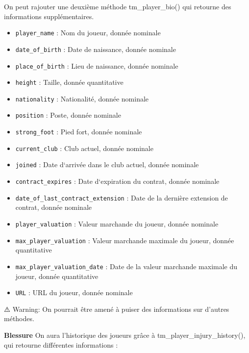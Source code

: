 \documentclass[
]{article}
\begin{document}
On peut rajouter une deuxième méthode tm\_player\_bio() qui retourne des
informations supplémentaires.

\begin{itemize}
\item
  \texttt{player\_name} : Nom du joueur, donnée nominale
\item
  \texttt{date\_of\_birth} : Date de naissance, donnée nominale
\item
  \texttt{place\_of\_birth} : Lieu de naissance, donnée nominale
\item
  \texttt{height} : Taille, donnée quantitative
\item
  \texttt{nationality} : Nationalité, donnée nominale
\item
  \texttt{position} : Poste, donnée nominale
\item
  \texttt{strong\_foot} : Pied fort, donnée nominale
\item
  \texttt{current\_club} : Club actuel, donnée nominale
\item
  \texttt{joined} : Date d`arrivée dans le club actuel, donnée nominale
\item
  \texttt{contract\_expires} : Date d`expiration du contrat, donnée
  nominale
\item
  \texttt{date\_of\_last\_contract\_extension} : Date de la dernière
  extension de contrat, donnée nominale
\item
  \texttt{player\_valuation} : Valeur marchande du joueur, donnée
  nominale
\item
  \texttt{max\_player\_valuation} : Valeur marchande maximale du joueur,
  donnée quantitative
\item
  \texttt{max\_player\_valuation\_date} : Date de la valeur marchande
  maximale du joueur, donnée quantitative
\item
  \texttt{URL} : URL du joueur, donnée nominale
\end{itemize}

⚠️ Warning: On pourrait être amené à puiser des informations sur
d'autres méthodes.

\textbf{Blessure} On aura l'historique des joueurs grâce à
tm\_player\_injury\_history(), qui retourne différentes informations :
\end{document}

